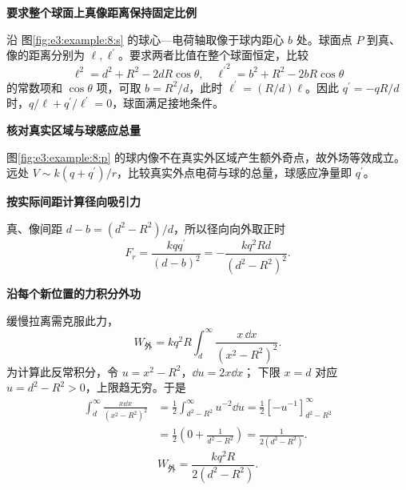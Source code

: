 \begin{solution}\textbf{要求整个球面上真像距离保持固定比例}\par\nobreak
沿 图\ref{fig:e3:example:8:s} 的球心—电荷轴取像于球内距心 $b$ 处。球面点 $P$ 到真、像的距离分别为 $\ell,\ell^\prime$。要求两者比值在整个球面恒定，比较
\[
 \ell^2=d^2+R^2-2dR\cos\theta,\quad
 {\ell^\prime}^2=b^2+R^2-2bR\cos\theta
\]
的常数项和 $\cos\theta$ 项，可取 $b=R^2/d$，此时 $\ell^\prime=(R/d)\ell$。因此 $q^\prime=-qR/d$ 时，$q/\ell+q^\prime/\ell^\prime=0$，球面满足接地条件。



\par\medskip{}\noindent\textbf{核对真实区域与球感应总量}\par\nobreak
图\ref{fig:e3:example:8:p} 的球内像不在真实外区域产生额外奇点，故外场等效成立。远处 $V\sim k(q+q^\prime)/r$，比较真实外点电荷与球的总量，球感应净量即 $q^\prime$。

\par\medskip{}\noindent\textbf{按实际间距计算径向吸引力}\par\nobreak
真、像间距 $d-b=(d^2-R^2)/d$，所以径向向外取正时
\[
 F_r=\frac{kqq^\prime}{(d-b)^2}
 =-\frac{kq^2Rd}{(d^2-R^2)^2}.
\]


\par\medskip{}\noindent\textbf{沿每个新位置的力积分外功}\par\nobreak
缓慢拉离需克服此力，
\[
 W_{\text{外}}=kq^2R\int_d^\infty\frac{x\,\dd x}{(x^2-R^2)^2}.
\]
为计算此反常积分，令 $u=x^2-R^2$，$\dd u=2x\dd x$；
下限 $x=d$ 对应 $u=d^2-R^2>0$，上限趋无穷。于是
\begin{align*}
 \int_d^\infty\frac{x\dd x}{(x^2-R^2)^2}
 &=\frac12\int_{d^2-R^2}^\infty u^{-2}\dd u
 =\frac12[-u^{-1}]_{d^2-R^2}^\infty\\
 &=\frac12\left(0+\frac1{d^2-R^2}\right)
 =\frac1{2(d^2-R^2)}.
\end{align*}
\[
 W_{\text{外}}=\frac{kq^2R}{2(d^2-R^2)}.
\]



\end{solution}
